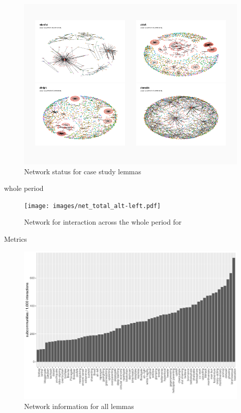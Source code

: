 \documentclass[
  a4paper,
  ]{scrartcl}
\begin{document}
        \begin{figure}[H]
          \centering
          \includegraphics[width=\linewidth, height=.8\textheight, keepaspectratio]{images/net_cases_last.pdf}
          \caption{Network status for case study lemmas}
        \end{figure}

      whole period

        \begin{figure}[H]
          \centering
          \texttt{[image: images/net\_total\_alt-left.pdf]}
          \caption{Network for interaction across the whole period for }
        \end{figure}

    Metrics

    \begin{figure}[H]
      \centering
      \includegraphics[width=\linewidth, height=.8\textheight, keepaspectratio]{images/communities_last_all.pdf}
      \caption{Network information for all lemmas}
    \end{figure}
\end{document}
